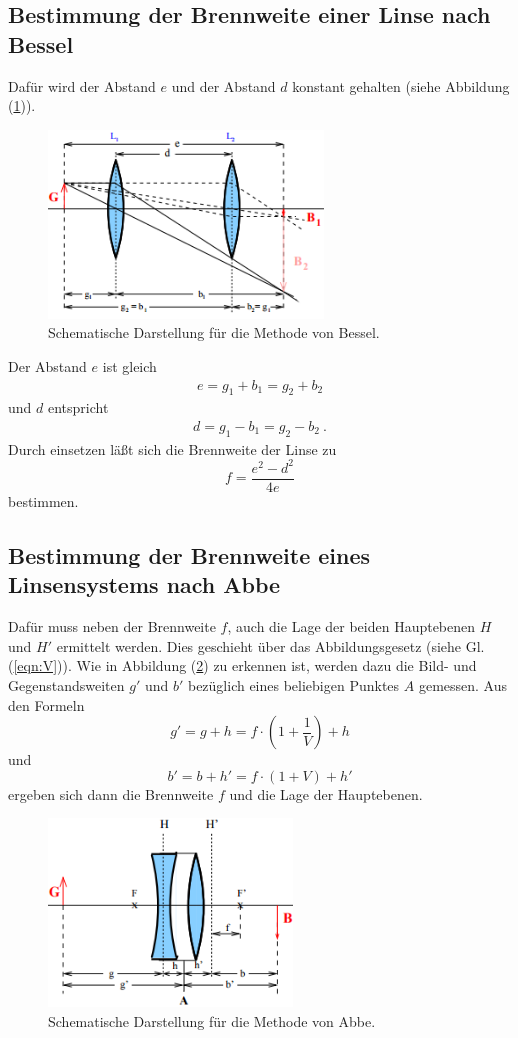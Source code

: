 \subsection{Bestimmung der Brennweite einer Linse nach Bessel}
Dafür wird der Abstand $e$ und der Abstand $d$ konstant gehalten (siehe Abbildung (\ref{fig:Bessel})).
\begin{figure}[H]
	\centering
	\includegraphics[height=5cm]{picture/Bessel}
	\caption{Schematische Darstellung für die Methode von Bessel. \cite{sample}}
	\label{fig:Bessel}
\end{figure}
Der Abstand $e$ ist gleich
\begin{align*}
	e = g_1 + b_1 = g_2 + b_2
\end{align*}
und $d$ entspricht
\begin{align*}
	d = g_1 - b_1 = g_2 - b_2 \ .
\end{align*}
Durch einsetzen läßt sich die Brennweite der Linse zu
\begin{equation}
	f = \frac{e^2 - d^2}{4e}
	\label{eqn:tbes}
\end{equation}
bestimmen.

\subsection{Bestimmung der Brennweite eines Linsensystems nach Abbe}
Dafür muss neben der Brennweite $f$, auch die Lage der beiden Hauptebenen $H$ und $H'$ ermittelt werden. Dies geschieht über das Abbildungsgesetz (siehe Gl. (\ref{eqn:V})). Wie in Abbildung (\ref{fig:Abbe}) zu erkennen ist, werden dazu die Bild- und Gegenstandsweiten $g'$ und $b'$ bezüglich eines beliebigen Punktes $A$ gemessen. Aus den Formeln
\begin{equation}
	g' = g + h = f \cdot \left( 1 + \frac{1}{V} \right) + h
	\label{eqn:g'}
\end{equation}
und
\begin{equation}
	b' = b + h' = f \cdot (1 + V) + h'
	\label{eqn:b'}
\end{equation}
ergeben sich dann die Brennweite $f$ und die Lage der Hauptebenen.

\begin{figure}[H]
	\centering
	\includegraphics[height=5cm]{picture/Abbe}
	\caption{Schematische Darstellung für die Methode von Abbe. \cite{sample}}
	\label{fig:Abbe}
\end{figure}
